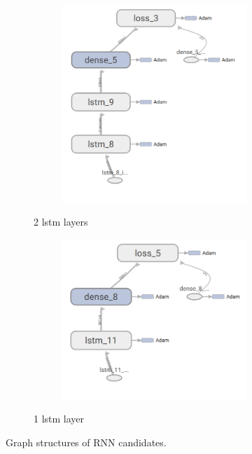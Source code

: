\begin{figure}
\begin{subfigure}[b]{0.3\linewidth}
\begin{subfigure}[b]{\linewidth}
			\includegraphics[width=\linewidth]{plots/rnn-candidates-2-lstm-1-dense.png}
		\end{subfigure}
		\caption{2 lstm layers}
	\end{subfigure}
	\begin{subfigure}[b]{0.3\linewidth}
		\begin{subfigure}[b]{\linewidth}
			\includegraphics[width=\linewidth]{plots/rnn-candidates-1-lstm-1-dense.png}
		\end{subfigure}
		\caption{1 lstm layer}
	\end{subfigure}
	\caption{Graph structures of \gls{RNN} candidates.}
	\label{fig:rnn-structure-abstract}
\end{figure}

